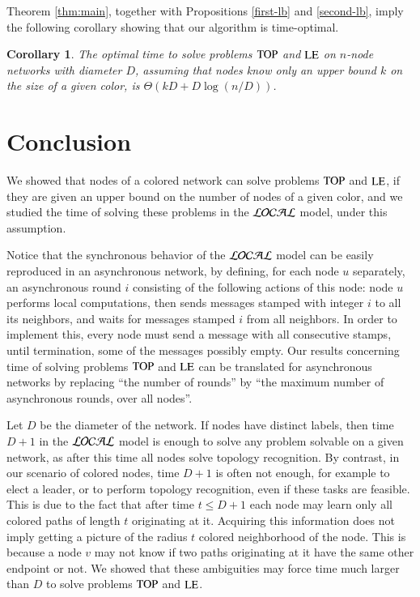 \documentclass[a4paper,10pt]{article}
\newtheorem{corollary}{Corollary}[section]
\newcommand{\problemLE}{\textup{LE}}
\newcommand{\problemTOP}{\textup{TOP}}
\begin{document}
Theorem \ref{thm:main}, together with Propositions \ref{first-lb} and \ref{second-lb}, imply the following corollary showing that our algorithm is time-optimal.

\begin{corollary}
The optimal time to solve problems $\problemTOP$ and $\problemLE$ on $n$-node networks with diameter $D$,
assuming that nodes know only an upper bound $k$ on the size of a given color, is $\Theta(kD+D\log(n/D))$.  
\end{corollary} 

\section{Conclusion}

We showed that nodes of a colored network can solve problems $\problemTOP$ and $\problemLE$, if they are given an upper bound on the number of nodes of a given color, and we studied the time
of solving these problems in the $\cal{LOCAL}$  model, under this assumption. 

Notice that the synchronous behavior of the $\cal{LOCAL}$  model can be easily reproduced in an asynchronous network, by defining, for each node $u$ separately, an asynchronous round $i$ consisting of the following actions of this node: node $u$ performs local computations, then sends messages stamped with integer $i$ to all its neighbors, and waits for messages stamped $i$ from all neighbors.
In order to implement this, every node must send a message with all consecutive stamps, until termination, some of the messages possibly empty.
Our results concerning time of solving problems $\problemTOP$ and $\problemLE$ can be translated for asynchronous networks by replacing ``the number of rounds''  by ``the maximum number of asynchronous rounds, over all nodes''.

Let $D$ be the diameter of the network.
If nodes have distinct labels, then time $D+1$ in the $\cal{LOCAL}$  model is enough to solve any problem solvable on a given network, as after this time all nodes solve topology recognition.
By contrast, in our scenario of colored nodes, time $D+1$ is often not enough, for example to elect a leader, or to perform topology recognition, even if these tasks are feasible.
This is due to the fact that after time $t\leq D+1$ each node may learn only all colored paths of length $t$ originating at it.
Acquiring this information does not imply getting a picture of the radius $t$ colored neighborhood of the node.
This is because a node $v$ may not know if two paths originating at it have the same other endpoint or not.
We showed that these ambiguities may force time much larger than $D$ to solve problems $\problemTOP$ and $\problemLE$.
\end{document}
